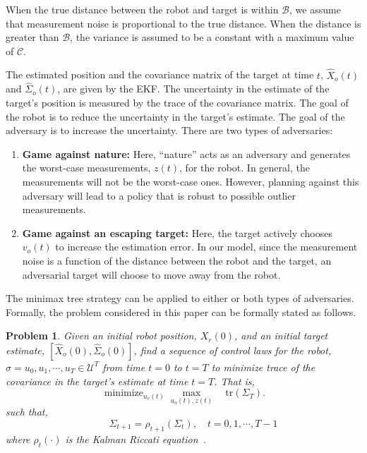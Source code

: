\documentclass[journal]{IEEEtran}
\newtheorem{problem}{Problem}
\begin{document}
When the true distance between the robot and target is within $\mathcal{B}$, we assume that measurement noise is proportional to the true distance. When the distance is greater than $\mathcal{B}$, the variance is assumed to be a constant with a maximum value of $\mathcal{C}$. 

The estimated position and the covariance matrix of the target at time $t$, $ \hat{X}_o(t)$ and  $\hat{\Sigma}_o(t)$, are given by the EKF. The uncertainty in the estimate of the target's position is measured by the trace of the covariance matrix. The goal of the robot is to reduce the uncertainty in the target's estimate. The goal of the adversary is to increase the uncertainty. There are two types of adversaries:
\begin{enumerate}
\item \textbf{Game against nature:} Here, ``nature'' acts as an adversary and generates the worst-case measurements, $z(t)$, for the robot. In general, the measurements will not be the worst-case ones. However, planning against this adversary will lead to a policy that is robust to possible outlier measurements.
\item \textbf{Game against an escaping target:} Here, the target actively chooses $v_o(t)$ to increase the estimation error. In our model, since the measurement noise is a function of the distance between the robot and the target, an adversarial target will choose to move away from the robot.
\end{enumerate}
The minimax tree strategy can be applied to either or both types of adversaries. Formally, the problem considered in this paper can be formally stated as follows.

\begin{problem} 
Given an initial robot position, $X_r(0)$, and an initial target estimate, $[\hat{X}_o(0), \hat{\Sigma}_o(0)]$, find a sequence of control laws for the robot, $\sigma=u_0, u_1,\cdots,  u_{T} \in \mathcal{U}^T$ from time $t=0$ to $t=T$ to minimize trace of the covariance in the target's estimate at time $t=T$. That is, 
\begin{equation}
  \label{eq5}
 \mathop{\text{minimize}}_{u_r(t)} \max_{u_o(t), z(t)}  \quad \text{tr}(\Sigma_T).
\end{equation}
such that,
 $$      \qquad  \Sigma_{t+1}=\rho_{{t+1}}(\Sigma_{t}),\quad t=0,1,\cdots, T-1 $$ 
where $\rho_{t}(\cdot)$ is the Kalman Riccati equation~\cite{kumar1986stochastic}. 
\label{prob:main}
\end{problem}
\end{document}

